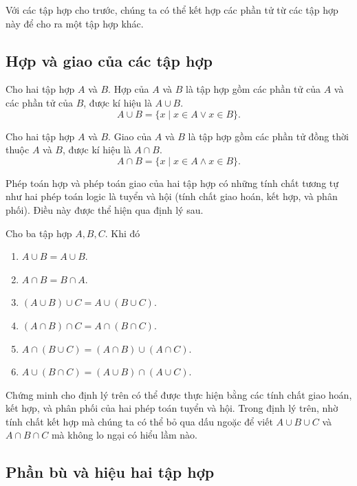 Với các tập hợp cho trước, chúng ta có thể kết hợp các phần tử từ các tập hợp này để cho ra một tập hợp khác.

\subsection{Hợp và giao của các tập hợp}

\begin{definition}
    Cho hai tập hợp $A$ và $B$. Hợp của $A$ và $B$ là tập hợp gồm các phần tử của $A$ và các phần tử của $B$, được kí hiệu là $A\cup B$.
    \[
        A\cup B = \{ x \mid x\in A \vee x\in B \}.
    \]
\end{definition}

\begin{definition}
    Cho hai tập hợp $A$ và $B$. Giao của $A$ và $B$ là tập hợp gồm các phần tử đồng thời thuộc $A$ và $B$, được kí hiệu là $A\cap B$.
    \[
        A\cap B = \{ x \mid x\in A \wedge x\in B \}.
    \]
\end{definition}

Phép toán hợp và phép toán giao của hai tập hợp có những tính chất tương tự như hai phép toán logic là tuyển và hội (tính chất giao hoán, kết hợp, và phân phối). Điều này được thể hiện qua định lý sau.

\begin{theorem}
    Cho ba tập hợp $A, B, C$. Khi đó
    \begin{enumerate}[label={(\roman*)}]
        \item $A\cup B = A\cup B$.
        \item $A\cap B = B\cap A$.
        \item $(A\cup B)\cup C = A\cup (B\cup C)$.
        \item $(A\cap B)\cap C = A\cap (B\cap C)$.
        \item $A\cap (B\cup C) = (A\cap B) \cup (A\cap C)$.
        \item $A\cup (B\cap C) = (A\cup B) \cap (A\cup C)$.
    \end{enumerate}
\end{theorem}

Chứng minh cho định lý trên có thể được thực hiện bằng các tính chất giao hoán, kết hợp, và phân phối của hai phép toán tuyển và hội. Trong định lý trên, nhờ tính chất kết hợp mà chúng ta có thể bỏ qua dấu ngoặc để viết $A\cup B\cup C$ và $A\cap B\cap C$ mà không lo ngại có hiểu lầm nào.

\subsection{Phần bù và hiệu hai tập hợp}

